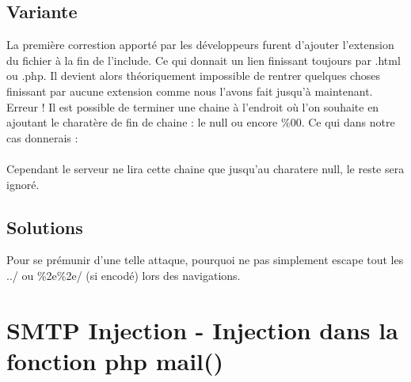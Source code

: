 \documentclass{article}
\begin{document}
\subsection{Variante}
\hspace*{0.6cm}La premi\`ere correstion apport\'e par les d\'eveloppeurs furent d'ajouter l'extension du fichier \`a la fin de l'include. Ce qui donnait un lien finissant toujours par .html ou .php. Il devient alors th\'eoriquement impossible de rentrer quelques choses finissant par aucune extension comme nous l'avons fait jusqu'\`a maintenant. Erreur ! Il est possible de terminer une chaine \`a l'endroit o\`u l'on souhaite en ajoutant le charat\`ere de fin de chaine : le null ou encore \%00. Ce qui dans notre cas donnerais :
\vspace{0.2cm}\\
\vspace{0cm}\\
Cependant le serveur ne lira cette chaine que jusqu'au charatere null, le reste sera ignor\'e.
\subsection{Solutions}
Pour se pr\'emunir d'une telle attaque, pourquoi ne pas simplement escape tout les ../ ou \%2e\%2e/ (si encod\'e) lors des navigations.

\newpage
\section{SMTP Injection - Injection dans la fonction php mail()}
\end{document}
